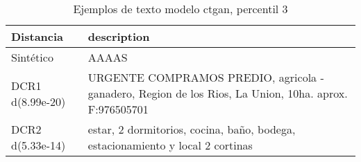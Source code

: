 \begin{table}[H]
\centering
\fontsize{10}{14}\selectfont
\caption{Ejemplos de texto modelo ctgan, percentil 3}
\label{table-example-economicos-b-1-ctgan-3p-text}
\begin{tabular}{|l|m{35em}|}
\hline
\rowcolor[gray]{0.8}
Distancia & description \\
\hline Sintético & AAAAS \\
\hline DCR1 d(8.99e-20) & URGENTE COMPRAMOS PREDIO, agricola - ganadero, Region de los Rios, La Union, 10ha. aprox. F:976505701 \\
\hline DCR2 d(5.33e-14) & estar, 2 dormitorios, cocina, ba\~no, bodega, estacionamiento y local 2 cortinas \\
\hline
\end{tabular}
\end{table}
